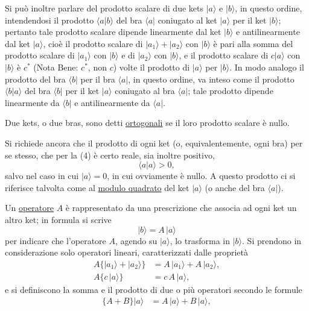 \documentclass[11pt, a4paper]{book}
\numberwithin{equation}{section}
\begin{document}

Si può inoltre parlare del prodotto scalare di due kets $|a\rangle$ e
$|b\rangle$, in questo ordine, intendendosi il prodotto $\langle a|b\rangle$
del bra $\langle a|$ coniugato al ket $|a\rangle$ per il ket $|b\rangle$;
pertanto tale prodotto scalare dipende linearmente dal ket $|b\rangle$ e
antilinearmente dal ket $|a\rangle$, cioè il prodotto scalare di
$|a_1\rangle+|a_2\rangle$ con $|b\rangle$ è pari alla somma del prodotto
scalare di $|a_1\rangle$ con $|b\rangle$ e di $|a_2\rangle$ con
$|b\rangle$, e il prodotto scalare di $c|a\rangle$ con $|b\rangle$ è
$c^*$ (Nota Bene: $c^*$, non $c$) volte il prodotto di $|a\rangle$ per
$|b\rangle$. In modo analogo il prodotto del bra $\langle b|$ per il bra
$\langle a|$, in questo ordine, va inteso come il prodotto $\langle b|a\rangle$
del bra $\langle b|$ per il ket $|a\rangle$ coniugato al bra $\langle a|$;
tale prodotto dipende linearmente da $\langle b|$ e antilinearmente da
$\langle a|$.

Due kets, o due bras, sono detti \uline{ortogonali} se il loro
prodotto scalare è nullo.

Si richiede ancora che il prodotto di ogni ket (o, equivalentemente,
ogni bra) per se stesso, che per la (4) è certo reale, sia inoltre
positivo,
\begin{equation}
\langle a|a\rangle > 0,
\end{equation}
salvo nel caso in cui $|a\rangle = 0$, in cui ovviamente è nullo. A
questo prodotto ci si riferisce talvolta come al \uline{modulo
quadrato} del ket $|a\rangle$ (o anche del bra $\langle a|$).

Un \uline{operatore} $A$ è rappresentato da una prescrizione che
associa ad ogni ket un altro ket; in formula si scrive
\begin{equation}
|b\rangle = A\,|a\rangle
\end{equation}
per indicare che l'operatore $A$, agendo su $|a\rangle$, lo trasforma in
$|b\rangle$. Si prendono in considerazione solo operatori lineari,
caratterizzati dalle proprietà
\begin{align}
A\bigl\{|a_1\rangle+|a_2\rangle\bigr\} &= A\,|a_1\rangle+A\,|a_2\rangle, \tag{9a} \\
A\bigl\{c\,|a\rangle\bigr\} &= c\,A\,|a\rangle, \tag{9b}
\end{align}
e si definiscono la somma e il prodotto di due o più operatori secondo
le formule
\begin{align}
\bigl\{A+B\bigr\}|a\rangle &= A\,|a\rangle + B\,|a\rangle, \tag{10}
\end{align}
\end{document}

